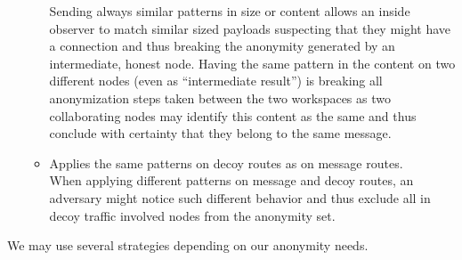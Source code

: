 \begin{itemize}
\begin{itemize}
		      Sending always similar patterns in size or content allows an inside observer to match similar sized payloads suspecting that they might have a connection and thus breaking the anonymity generated by an intermediate, honest node. Having the same pattern in the content on two different nodes (even as ``intermediate result'') is breaking all anonymization steps taken between the two workspaces as two collaborating nodes may identify this content as the same and thus conclude with certainty that they belong to the same message.
		\item Applies the same patterns on decoy routes as on message routes.\\
		      When applying different patterns on message and decoy routes, an adversary might notice such different behavior and thus exclude all in decoy traffic involved nodes from the anonymity set. 
	\end{itemize}
\end{itemize}

We may use several strategies depending on our anonymity needs. 

